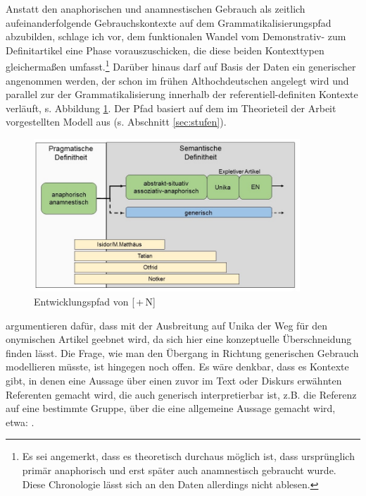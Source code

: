 Anstatt den anaphorischen und anamnestischen Gebrauch als zeitlich aufeinanderfolgende Gebrauchskontexte  auf dem Grammatikalisierungspfad abzubilden, schlage ich vor, dem funktionalen Wandel vom Demonstrativ- zum Definitartikel eine Phase vorauszuschicken, die diese beiden Kontexttypen gleichermaßen umfasst.\footnote{Es sei angemerkt, dass es theoretisch durchaus möglich ist, dass  ursprünglich primär anaphorisch und erst später auch anamnestisch gebraucht wurde. Diese Chronologie lässt sich an den Daten allerdings nicht ablesen.} Darüber hinaus darf auf Basis der Daten ein generischer  angenommen werden, der schon im frühen Althochdeutschen angelegt wird und parallel zur  der Grammatikalisierung innerhalb der referentiell-definiten Kontexte verläuft, s. Abbildung \ref{abb:expansion-definitheit}. Der Pfad basiert auf dem im Theorieteil der Arbeit vorgestellten Modell aus \textcite{Schmuck2014} (s. Abschnitt \ref{sec:stufen}). 

 
\begin{figure}
\begin{center}
  \includegraphics[width=10cm]{images/diskussion-generisch-farbe-neu.jpg}
\caption {Entwicklungspfad von [\,+\,N]} 
\label{abb:expansion-definitheit}
\end{center}
\end{figure} 
 
\textcite[105]{Schmuck2014} argumentieren dafür, dass mit der Ausbreitung auf Unika der Weg für den onymischen Artikel geebnet wird, da sich hier eine konzeptuelle Überschneidung finden lässt. Die Frage, wie man den Übergang in Richtung generischen Gebrauch modellieren müsste, ist hingegen noch offen. Es wäre denkbar, dass es Kontexte gibt, in denen eine Aussage über einen zuvor im Text oder Diskurs erwähnten Referenten gemacht wird, die auch generisch interpretierbar ist, z.B. die Referenz auf eine bestimmte Gruppe, über die eine allgemeine Aussage gemacht wird, etwa: . 

